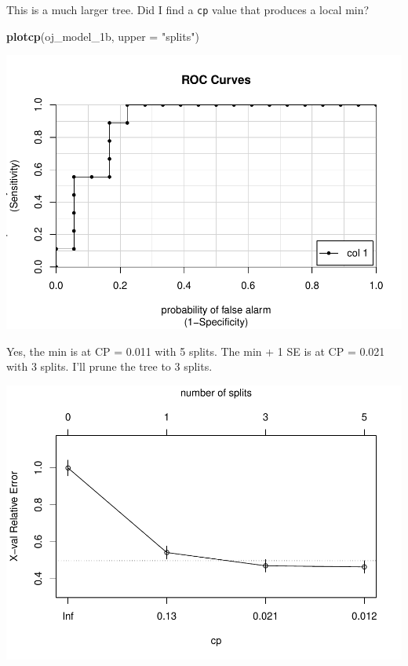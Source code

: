 \documentclass[]{book}
\newenvironment{Shaded}{\begin{snugshade}}{\end{snugshade}}
\newcommand{\DataTypeTok}[1]{\textcolor[rgb]{0.13,0.29,0.53}{#1}}
\newcommand{\DecValTok}[1]{\textcolor[rgb]{0.00,0.00,0.81}{#1}}
\newcommand{\KeywordTok}[1]{\textcolor[rgb]{0.13,0.29,0.53}{\textbf{#1}}}
\newcommand{\NormalTok}[1]{#1}
\newcommand{\OperatorTok}[1]{\textcolor[rgb]{0.81,0.36,0.00}{\textbf{#1}}}
\newcommand{\OtherTok}[1]{\textcolor[rgb]{0.56,0.35,0.01}{#1}}
\newcommand{\StringTok}[1]{\textcolor[rgb]{0.31,0.60,0.02}{#1}}
\begin{document}
This is a much larger tree. Did I find a \texttt{cp} value that produces a local min?

\begin{Shaded}
\begin{Highlighting}[]
\KeywordTok{plotcp}\NormalTok{(oj_model_1b, }\DataTypeTok{upper =} \StringTok{"splits"}\NormalTok{)}
\end{Highlighting}
\end{Shaded}

\includegraphics{data-sci_files/figure-latex/unnamed-chunk-32-1.pdf}

Yes, the min is at CP = 0.011 with 5 splits. The min + 1 SE is at CP = 0.021 with 3 splits. I'll prune the tree to 3 splits.

\begin{Shaded}
\end{Shaded}

\includegraphics{data-sci_files/figure-latex/unnamed-chunk-33-1.pdf}
\end{document}
